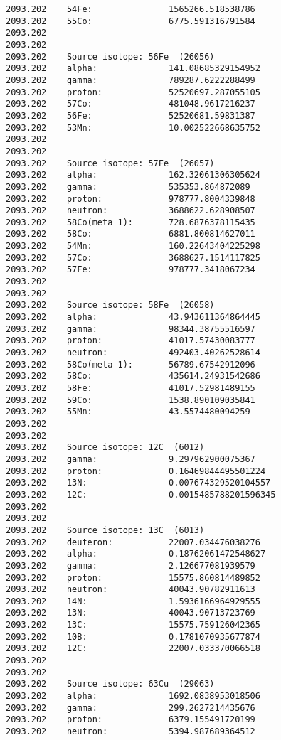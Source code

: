 \begin{lstlisting}[style=sOutputFile,caption={Final results for steel irradiation},label={listing:alexsteel}]
2093.202    54Fe:               1565266.518538786
2093.202    55Co:               6775.591316791584
2093.202    
2093.202    
2093.202    Source isotope: 56Fe  (26056)
2093.202    alpha:              141.08685329154952
2093.202    gamma:              789287.6222288499
2093.202    proton:             52520697.287055105
2093.202    57Co:               481048.9617216237
2093.202    56Fe:               52520681.59831387
2093.202    53Mn:               10.002522668635752
2093.202    
2093.202    
2093.202    Source isotope: 57Fe  (26057)
2093.202    alpha:              162.32061306305624
2093.202    gamma:              535353.864872089
2093.202    proton:             978777.8004339848
2093.202    neutron:            3688622.628908507
2093.202    58Co(meta 1):       728.6876378115435
2093.202    58Co:               6881.800814627011
2093.202    54Mn:               160.22643404225298
2093.202    57Co:               3688627.1514117825
2093.202    57Fe:               978777.3418067234
2093.202    
2093.202    
2093.202    Source isotope: 58Fe  (26058)
2093.202    alpha:              43.943611364864445
2093.202    gamma:              98344.38755516597
2093.202    proton:             41017.57430083777
2093.202    neutron:            492403.40262528614
2093.202    58Co(meta 1):       56789.67542912096
2093.202    58Co:               435614.24931542686
2093.202    58Fe:               41017.52981489155
2093.202    59Co:               1538.890109035841
2093.202    55Mn:               43.5574480094259
2093.202    
2093.202    
2093.202    Source isotope: 12C  (6012)
2093.202    gamma:              9.297962900075367
2093.202    proton:             0.16469844495501224
2093.202    13N:                0.007674329520104557
2093.202    12C:                0.0015485788201596345
2093.202    
2093.202    
2093.202    Source isotope: 13C  (6013)
2093.202    deuteron:           22007.034476038276
2093.202    alpha:              0.18762061472548627
2093.202    gamma:              2.126677081939579
2093.202    proton:             15575.860814489852
2093.202    neutron:            40043.90782911613
2093.202    14N:                1.5936166964929555
2093.202    13N:                40043.90713723769
2093.202    13C:                15575.759126042365
2093.202    10B:                0.1781070935677874
2093.202    12C:                22007.033370066518
2093.202    
2093.202    
2093.202    Source isotope: 63Cu  (29063)
2093.202    alpha:              1692.0838953018506
2093.202    gamma:              299.2627214435676
2093.202    proton:             6379.155491720199
2093.202    neutron:            5394.987689364512

\end{lstlisting}
